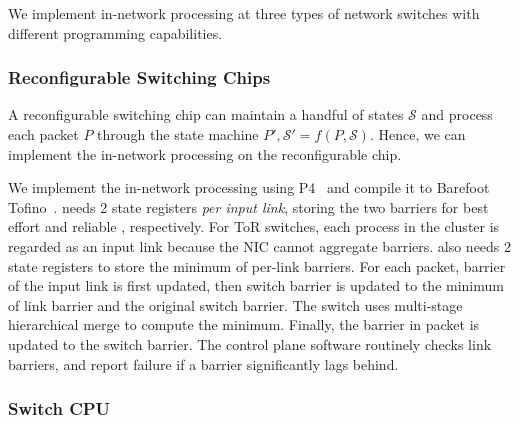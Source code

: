 We implement in-network processing at three types of network switches with different programming capabilities.


\subsubsection{Reconfigurable Switching Chips}
\label{sec:p4}
A reconfigurable switching chip can maintain 
a handful of states $\mathcal{S}$ and process each packet $P$ through the state machine $P', \mathcal{S}' = f(P, \mathcal{S})$. Hence, we can implement the in-network processing on the reconfigurable chip.

We implement the in-network processing using P4~\cite{bosshart2014p4} and compile it to Barefoot Tofino~\cite{tofino}. \sys{} needs 2 state registers \emph{per input link}, storing the two barriers for best effort and reliable \sys{}, respectively.
For ToR switches, each process in the cluster is regarded as an input link because the NIC cannot aggregate barriers.
\sys{} also needs 2 state registers to store the minimum of per-link barriers.
For each packet, barrier of the input link is first updated, then switch barrier is updated to the minimum of link barrier and the original switch barrier. The switch uses multi-stage hierarchical merge to compute the minimum. Finally, the barrier in packet is updated to the switch barrier. The control plane software routinely checks link barriers, and report failure if a barrier significantly lags behind.



\subsubsection{Switch CPU}
\label{sec:commodity}

